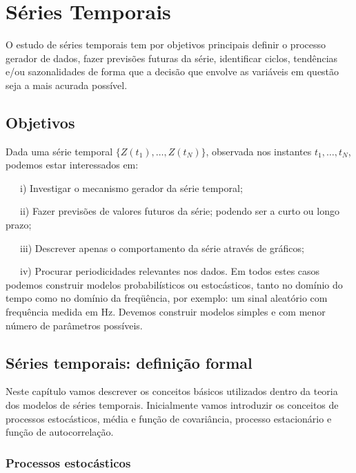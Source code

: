 \documentclass[
]{book}
\theoremstyle{definition}
\theoremstyle{definition}
\theoremstyle{definition}
\theoremstyle{remark}
\begin{document}
\hypertarget{st}{%
\chapter{Séries Temporais}\label{st}}

O estudo de séries temporais tem por objetivos principais definir o processo gerador de dados, fazer previsões futuras da série, identificar ciclos, tendências e/ou sazonalidades de forma que a decisão que envolve as variáveis em questão seja a mais acurada possível.

\hypertarget{objetivos}{%
\section{Objetivos}\label{objetivos}}

Dada uma série temporal \(\{Z(t_1 ),\ldots, Z(t_N)\}\), observada nos instantes \(t_1,\ldots,t_N\),
podemos estar interessados em:

~~~i) Investigar o mecanismo gerador da série temporal;

~~~ii) Fazer previsões de valores futuros da série; podendo ser a curto ou longo prazo;

~~~iii) Descrever apenas o comportamento da série através de gráficos;

~~~iv) Procurar periodicidades relevantes nos dados. Em todos estes casos podemos construir modelos probabilísticos ou estocásticos, tanto no domínio do tempo como no domínio da freqüência, por exemplo: um sinal aleatório com frequência medida em Hz. Devemos construir modelos simples e com menor número de parâmetros possíveis.

\hypertarget{suxe9ries-temporais-definiuxe7uxe3o-formal}{%
\section{Séries temporais: definição formal}\label{suxe9ries-temporais-definiuxe7uxe3o-formal}}

Neste capítulo vamos descrever os conceitos básicos utilizados dentro da teoria dos modelos de séries temporais. Inicialmente vamos introduzir os conceitos de processos estocásticos, média e função de covariância, processo estacionário e função de autocorrelação.

\hypertarget{processos-estocuxe1sticos}{%
\subsection{Processos estocásticos}\label{processos-estocuxe1sticos}}
\end{document}
